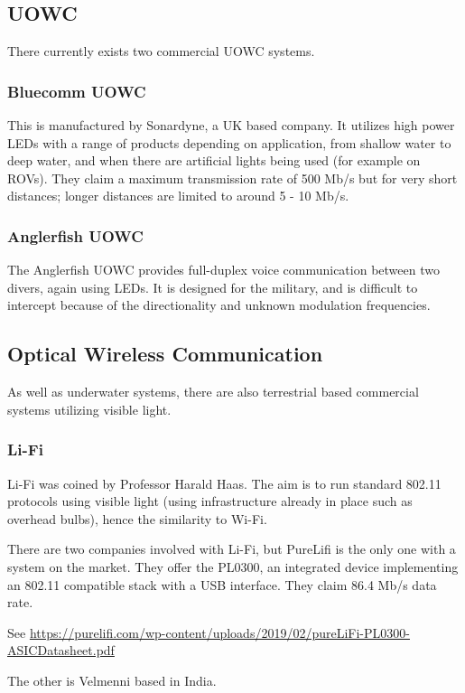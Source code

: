 \documentclass{article}
\begin{document}
\subsection{\ac{UOWC}}
There currently exists two commercial \ac{UOWC} systems.

\subsubsection{Bluecomm \ac{UOWC}}
This is manufactured by Sonardyne, a UK based company. It utilizes high power \ac{LED}s with a range of products depending on application, from shallow water to deep water, and when there are artificial lights being used (for example on \ac{ROV}s). They claim a maximum transmission rate of 500 Mb/s but for very short distances; longer distances are limited to around 5 - 10 Mb/s.

\subsubsection{Anglerfish \ac{UOWC}}
The Anglerfish \ac{UOWC} provides full-duplex voice communication between two divers, again using \ac{LED}s. It is designed for the military, and is difficult to intercept because of the directionality and unknown modulation frequencies.

\subsection{Optical Wireless Communication}
As well as underwater systems, there are also terrestrial based commercial systems utilizing visible light.

\subsubsection{Li-Fi}
Li-Fi was coined by Professor Harald Haas. The aim is to run standard 802.11 protocols using visible light (using infrastructure already in place such as overhead bulbs), hence the similarity to Wi-Fi.

There are two companies involved with Li-Fi, but PureLifi is the only one with a system on the market. They offer the PL0300, an integrated device implementing an 802.11 compatible stack with a USB interface. They claim 86.4 Mb/s data rate.

See \url{https://purelifi.com/wp-content/uploads/2019/02/pureLiFi-PL0300-ASICDatasheet.pdf}

The other is Velmenni based in India.
\end{document}
